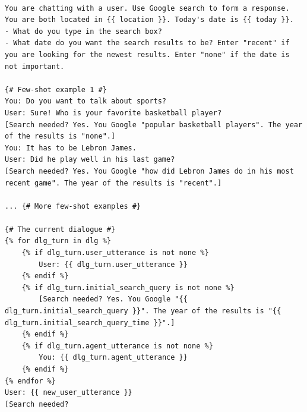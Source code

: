 \documentclass[11pt]{article}
\newcommand{\system}[0]{WikiChat\xspace}
\begin{document}
\begin{table}
\begin{lstlisting}[basicstyle=\ttfamily\small]

You are chatting with a user. Use Google search to form a response. You are both located in {{ location }}. Today's date is {{ today }}.
- What do you type in the search box?
- What date do you want the search results to be? Enter "recent" if you are looking for the newest results. Enter "none" if the date is not important.

{# Few-shot example 1 #}
You: Do you want to talk about sports?
User: Sure! Who is your favorite basketball player?
[Search needed? Yes. You Google "popular basketball players". The year of the results is "none".]
You: It has to be Lebron James.
User: Did he play well in his last game?
[Search needed? Yes. You Google "how did Lebron James do in his most recent game". The year of the results is "recent".]

... {# More few-shot examples #}

{# The current dialogue #}
{% for dlg_turn in dlg %}
    {% if dlg_turn.user_utterance is not none %}
        User: {{ dlg_turn.user_utterance }}
    {% endif %}
    {% if dlg_turn.initial_search_query is not none %}
        [Search needed? Yes. You Google "{{ dlg_turn.initial_search_query }}". The year of the results is "{{ dlg_turn.initial_search_query_time }}".]
    {% endif %}
    {% if dlg_turn.agent_utterance is not none %}
        You: {{ dlg_turn.agent_utterance }}
    {% endif %}
{% endfor %}
User: {{ new_user_utterance }}
[Search needed?
\end{lstlisting}
\caption{Query generation prompt in \system (Stage 1). This prompt has 6 few-shot examples.}
\label{prompt:query-generation}
\end{table}
\end{document}
